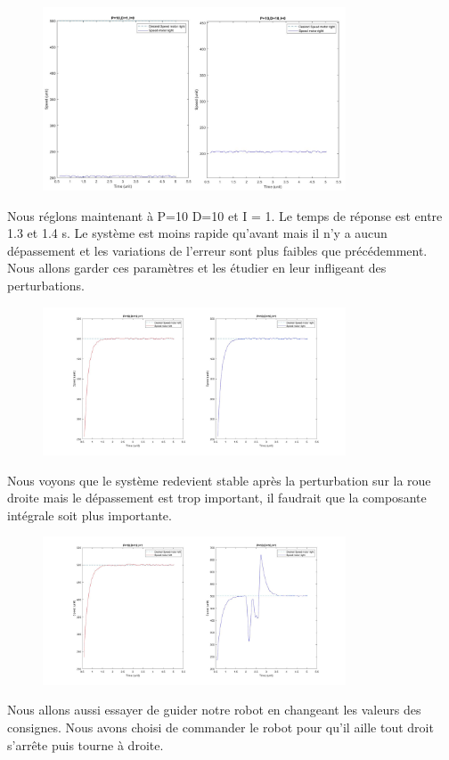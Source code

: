 \documentclass[a4paper]{article}
\begin{document}
		\begin{figure}[h]
			\centering
			\includegraphics[width = 9cm]{imgs/fig7.png}
			\caption{}
		\end{figure}
		Nous réglons maintenant à P=10 D=10 et I = 1. Le temps de réponse est entre 1.3 et 1.4 s. Le système est moins rapide qu’avant mais il n’y a aucun dépassement et les variations de l’erreur sont plus faibles que précédemment. Nous allons garder ces paramètres et les étudier en leur infligeant des perturbations.\\
		\newpage
	
		\begin{figure}[h]
			\centering
			\includegraphics[width = 9cm]{imgs/fig8.jpg}
			\caption{}
		\end{figure}
		Nous voyons que le système redevient stable après la perturbation sur la roue droite mais le dépassement est trop important, il faudrait que la composante intégrale soit plus importante.
		
		\begin{figure}[h]
			\centering
			\includegraphics[width = 9cm]{imgs/fig9.jpg}
			\caption{}
		\end{figure}
		Nous allons aussi essayer de guider notre robot en changeant les valeurs des consignes. Nous avons choisi de commander le robot pour qu’il aille tout droit s’arrête puis tourne à droite.
		\newpage
		
\end{document}
